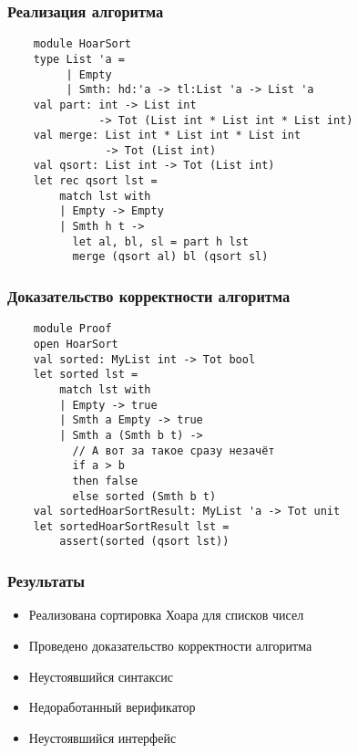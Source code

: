 \documentclass{beamer}
\begin{document}
\begin{frame}[fragile]
  \transwipe[direction=90]
  \frametitle{Реализация алгоритма}
  \begin{verbatim}
    module HoarSort
    type List 'a =
         | Empty
         | Smth: hd:'a -> tl:List 'a -> List 'a
    val part: int -> List int 
              -> Tot (List int * List int * List int)
    val merge: List int * List int * List int 
               -> Tot (List int)
    val qsort: List int -> Tot (List int)
    let rec qsort lst =
        match lst with
        | Empty -> Empty
        | Smth h t ->
          let al, bl, sl = part h lst
          merge (qsort al) bl (qsort sl)
  \end{verbatim}
\end{frame}

\begin{frame}[fragile]
  \transwipe[direction=90]
  \frametitle{Доказательство корректности алгоритма}
  \begin{verbatim}
    module Proof
    open HoarSort
    val sorted: MyList int -> Tot bool
    let sorted lst =
        match lst with
        | Empty -> true
        | Smth a Empty -> true
        | Smth a (Smth b t) ->
          // А вот за такое сразу незачёт
          if a > b
          then false
          else sorted (Smth b t)
    val sortedHoarSortResult: MyList 'a -> Tot unit
    let sortedHoarSortResult lst =
        assert(sorted (qsort lst))
  \end{verbatim}
\end{frame}

\begin{frame}
  \transwipe[direction=90]
  \frametitle{Результаты}
  \begin{itemize}
    \item Реализована сортировка Хоара для списков чисел
    \item Проведено доказательство корректности алгоритма
  \end{itemize}
  \begin{itemize}
    \item Неустоявшийся синтаксис
    \item Недоработанный верификатор
    \item Неустоявшийся интерфейс
  \end{itemize}
\end{frame}
\end{document}
